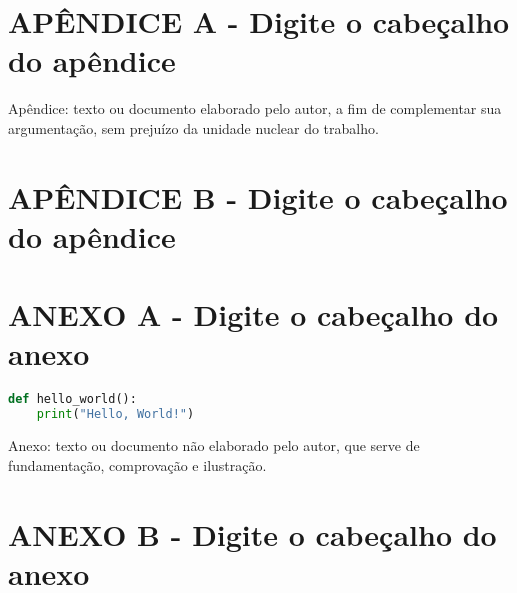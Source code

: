 \documentclass[
	12pt,				%
	openright,			%
	oneside,			%
	a4paper,			%
	brazil				%
	]{abntex2}
\begin{document}
\begin{apendicesenv}

\partapendices

\chapter*{\normalsize APÊNDICE A - Digite o cabeçalho do apêndice}

Apêndice: texto ou documento elaborado pelo autor, a fim de complementar sua argumentação, sem prejuízo da unidade nuclear do trabalho.

\chapter*{\normalsize APÊNDICE B - Digite o cabeçalho do apêndice}

\end{apendicesenv}

\begin{anexosenv}

\partanexos
\renewcommand{\ABNTEXchapterfontsize}{\ABNTEXsectionfont}

\chapter*{\normalsize ANEXO A - Digite o cabeçalho do anexo}
\begin{lstlisting}[language = Python, caption={Código}, label={lst:hello_world}]
def hello_world():
    print("Hello, World!")
\end{lstlisting}
Anexo: texto ou documento não elaborado pelo autor, que serve de fundamentação, comprovação e ilustração.

\chapter*{\normalsize ANEXO B - Digite o cabeçalho do anexo}

\end{anexosenv}
\end{document}

